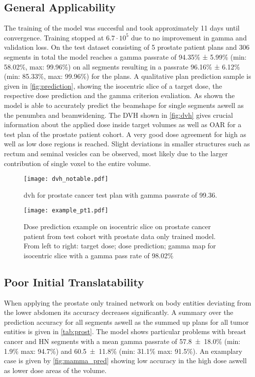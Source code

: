 \subsection{General Applicability}

The training of the model was succesful and took approximately 11 days until convergence. Training stopped at $6.7\cdot10^5$ due to no improvement in gamma and validation loss. 
On the test dataset consisting of 5 prostate patient plans and 306 segments in total the model reaches a gamma passrate of 94.35\% ± 5.99\% (min: 58.02\%, max: 99.96\%) on all segments resulting in a passrate 96.16\% ± 6.12\% (min: 85.33\%, max: 99.96\%) for the plans. 
A qualitative plan prediction sample is given in \autoref{fig:prediction}, showing the isocentric slice of a target dose, the respective dose prediction and the gamma criterion evaliation. 
As shown the model is able to accurately predict the beamshape for single segments aswell as the penumbra and beamwidening. 
The \ac{DVH} shown in \autoref{fig:dvh} gives crucial information about the applied dose inside target volumes as well as \ac{OAR} for a test plan of the prostate patient cohort.
A very good dose agreement for high as well as low dose regions is reached. 
Slight deviations in smaller structures such as rectum and seminal vesicles can be observed, most likely due to the larger contribution of single voxel to the entire volume.

\begin{figure}
    \centering
    \texttt{[image: dvh\_notable.pdf]}
    \caption{dvh for prostate cancer test plan with gamma passrate of 99.36.}\label{fig:dvh}
\end{figure}

\begin{figure}
    \centering
    \texttt{[image: example\_pt1.pdf]}
    \caption{
        Dose prediction example on isocentric slice on prostate cancer patient from test cohort with prostate data only trained model. 
        From left to right: target dose; dose prediction; gamma map for isocentric slice with a gamma pass rate of 98.02\%
    }\label{fig:prediction}
\end{figure}



\subsection{Poor Initial Translatability}

When applying the prostate only trained network on body entities deviating from the lower abdomen its accuracy decreases significantly. 
A summary over the prediction accuracy for all segments aswell as the summed up plans for all tumor entities is given in \autoref{tab:prost}. 
The model shows particular problems with breast cancer and \acs{HN} segments with a mean gamma passrate of 57.8~±~18.0\% (min: 1.9\% max: 94.7\%) and 60.5~±~11.8\% (min: 31.1\% max: 91.5\%). 
An examplary case is given by \autoref{fig:mamma_pred} showing low accuracy in the high dose aswell as lower dose areas of the volume.


